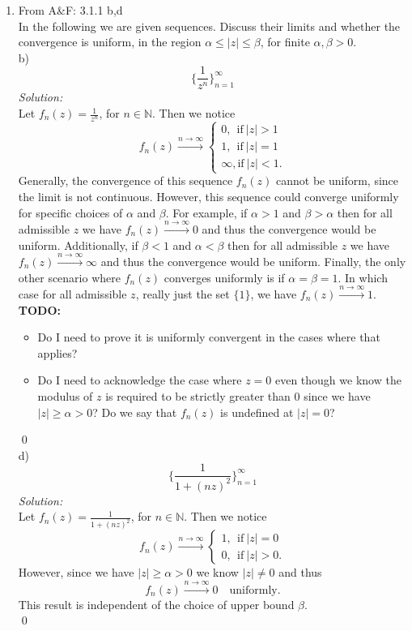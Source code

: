 \documentclass[10pt]{amsart}
\theoremstyle{nonumberplain}
\begin{document}
\begin{enumerate}[label={\bf {\arabic*}:}]
\item From A\&F: 3.1.1 b,d \\
In the following we are given sequences.
Discuss their limits and whether the convergence is uniform, in the region $\alpha \leq |z| \leq \beta$, for finite $\alpha, \beta > 0$. \\
b) $$ \bigg\{ \frac 1 {z^n} \bigg\}_{n=1}^{\infty} $$
\textit{Solution:}\\
Let $f_n(z) = \frac 1 {z^n}$, for $n \in \mathbb N$. Then we notice
$$
f_n(z) \overset{n \to \infty}{\longrightarrow} \begin{cases}
0, \: \: \text{if}\: |z| > 1 \\
1, \: \: \text{if}\: |z| = 1 \\
\infty, \text{if}\: |z| < 1.
\end{cases}
$$
Generally, the convergence of this sequence $f_n(z)$ cannot be uniform, since the limit is not continuous.
However, this sequence could converge uniformly for specific choices of $\alpha$ and $\beta$.
For example, if $\alpha >1$ and $\beta > \alpha$ then for all admissible $z$ we have $f_n(z) \overset{n \to \infty}{\longrightarrow} 0$ and thus the convergence would be uniform.
Additionally, if $\beta < 1$ and $\alpha < \beta$ then for all admissible $z$ we have $f_n(z) \overset{n \to \infty}{\longrightarrow} \infty$ and thus the convergence would be uniform.
Finally, the only other scenario where $f_n(z)$ converges uniformly is if $\alpha = \beta = 1$.
In which case for all admissible $z$, really just the set $\{1\}$, we have $f_n(z) \overset{n \to \infty}{\longrightarrow} 1$. \\
\textbf{TODO:}
\begin{itemize}
\item Do I need to prove it is uniformly convergent in the cases where that applies?
\item Do I need to acknowledge the case where $z=0$ even though we know the modulus of $z$ is required to be strictly greater than $0$ since we have $|z| \geq \alpha > 0$?
Do we say that $f_n(z)$ is undefined at $|z| = 0$?
\end{itemize}
\qed \\

\noindent
d) $$ \bigg\{ \frac 1 {1 + (nz)^2} \bigg\}_{n=1}^{\infty} $$
\textit{Solution:}\\
Let $f_n(z) = \frac 1 {1 + (nz)^2}$, for $n \in \mathbb N$. Then we notice
$$
f_n(z) \overset{n \to \infty}{\longrightarrow} \begin{cases}
1, \: \: \text{if}\: |z| = 0 \\
0, \: \: \text{if}\: |z| > 0.
\end{cases}
$$
However, since we have $|z| \geq \alpha > 0$ we know $|z| \neq 0$ and thus
$$
f_n(z) \overset{n \to \infty}{\longrightarrow} 0 \quad \text{uniformly}.
$$
This result is independent of the choice of upper bound $\beta$. \\
\qed
\newpage


\end{enumerate}
\end{document}
